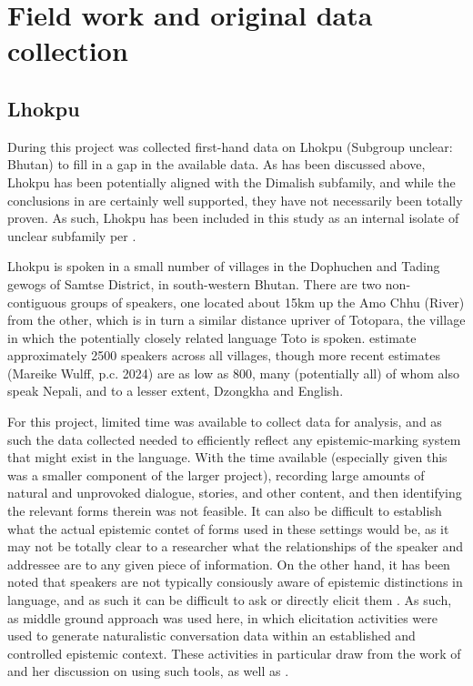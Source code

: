 \appendix
\chapter{Field work and original data collection}\label{s:Methods:FieldMethods}
\section{Lhokpu}
During this project was collected first-hand data on Lhokpu (Subgroup unclear: Bhutan) to fill in a gap in the available data. As has been discussed above, Lhokpu has been potentially aligned with the Dimalish subfamily, and while the conclusions in  are certainly well supported, they have not necessarily been totally proven. As such, Lhokpu has been included in this study as an internal isolate of unclear subfamily per .

Lhokpu is spoken in a small number of villages in the Dophuchen and Tading gewogs of Samtse District, in  south-western Bhutan. There are two non-contiguous groups of speakers, one located about 15km up the Amo Chhu (River) from the other, which is in turn a similar distance upriver of Totopara, the village in which the potentially closely related language Toto is spoken.  estimate approximately 2500 speakers across all villages, though more recent estimates (Mareike Wulff, p.c. 2024) are as low as 800, many (potentially all) of whom also speak Nepali, and to a lesser extent, Dzongkha and English.

For this project, limited time was available to collect data for analysis, and as such the data collected needed to efficiently reflect any epistemic-marking system that might exist in the language. With the time available (especially given this was a smaller component of the larger project), recording large amounts of natural and unprovoked dialogue, stories, and other content, and then identifying the relevant forms therein was not feasible. It can also be difficult to establish what the actual epistemic contet of forms used in these settings would be, as it may not be totally clear to a researcher what the relationships of the speaker and addressee are to any given piece of information. On the other hand, it has been noted that speakers are not typically consiously aware of epistemic distinctions in language, and as such it can be difficult to ask or directly elicit them \cites{Gawne2013}{Grzech2020}. As such, as middle ground approach was used here, in which elicitation activities were used to generate naturalistic conversation data within an established and controlled epistemic context. These activities in particular draw from the work of  and her discussion on using such tools, as well as . 

